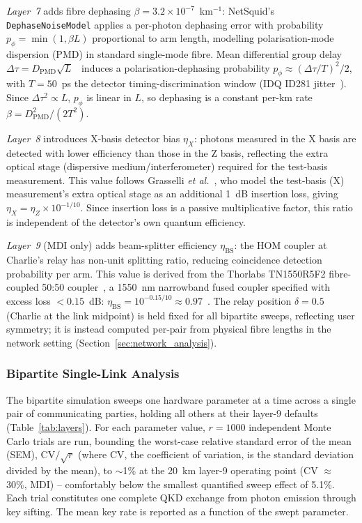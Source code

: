 \documentclass[12pt]{article}
\begin{document}
\textit{Layer~7} adds fibre dephasing $\beta = 3.2\times10^{-7}$~km$^{-1}$: NetSquid's \texttt{DephaseNoiseModel} applies a per-photon dephasing error with probability $p_\phi = \min(1, \beta L)$ proportional to arm length, modelling polarisation-mode dispersion (PMD) in standard single-mode fibre. Mean differential group delay $\Delta\tau = D_\text{PMD}\sqrt{L}$~\cite{Agrawal_2010} induces a polarisation-dephasing probability $p_\phi \approx (\Delta\tau/T)^2/2$, with $T=50$~ps the detector timing-discrimination window (IDQ ID281 jitter~\cite{idq_id281}). Since $\Delta\tau^2 \propto L$, $p_\phi$ is linear in $L$, so dephasing is a constant per-km rate $\beta = D_\text{PMD}^2/(2T^2)$.

\textit{Layer~8} introduces X-basis detector bias $\eta_X$: photons measured in the X basis are detected with lower efficiency than those in the Z basis, reflecting the extra optical stage (dispersive medium/interferometer) required for the test-basis measurement. This value follows Grasselli \textit{et al.}~\cite{Grasselli_2025}, who model the test-basis (X) measurement's extra optical stage as an additional 1~dB insertion loss, giving $\eta_X = \eta_Z \times 10^{-1/10}$. Since insertion loss is a passive multiplicative factor, this ratio is independent of the detector's own quantum efficiency.

\textit{Layer~9} (MDI only) adds beam-splitter efficiency $\eta_\text{BS}$: the HOM coupler at Charlie's relay has non-unit splitting ratio, reducing coincidence detection probability per arm. This value is derived from the Thorlabs TN1550R5F2 fibre-coupled 50:50 coupler~\cite{thorlabs_tn1550r5f2}, a 1550~nm narrowband fused coupler specified with excess loss $<0.15$~dB: $\eta_\text{BS} = 10^{-0.15/10} \approx 0.97$~\cite{Agrawal_2010}. The relay position $\delta = 0.5$ (Charlie at the link midpoint) is held fixed for all bipartite sweeps, reflecting user symmetry; it is instead computed per-pair from physical fibre lengths in the network setting (Section~\ref{sec:network_analysis}).

\subsubsection{Bipartite Single-Link Analysis}

The bipartite simulation sweeps one hardware parameter at a time across a single pair of communicating parties, holding all others at their layer-9 defaults (Table~\ref{tab:layers}). For each parameter value, $r = 1000$ independent Monte Carlo trials are run, bounding the worst-case relative standard error of the mean (SEM), $\text{CV}/\sqrt{r}$ (where CV, the coefficient of variation, is the standard deviation divided by the mean), to $\sim$1\% at the 20~km layer-9 operating point (CV $\approx$ 30\%, MDI) -- comfortably below the smallest quantified sweep effect of 5.1\%. Each trial constitutes one complete QKD exchange from photon emission through key sifting. The mean key rate is reported as a function of the swept parameter.
\end{document}
